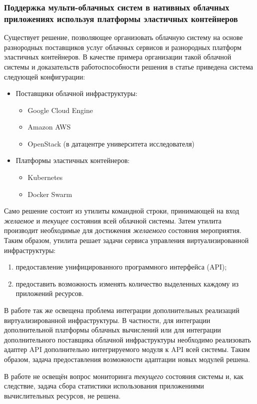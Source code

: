 \subsubsection*{Поддержка мульти-облачных систем в нативных облачных приложениях используя платформы эластичных контейнеров}
Существует решение\cite{smuggling}, позволяющее организовать облачную систему на основе разнородных поставщиков услуг облачных сервисов и разнородных платформ эластичных контейнеров.
В качестве примера организации такой облачной системы и доказательств работоспособности решения в статье приведена система следующей конфигурации:
\begin{itemize}
    \item Поставщики облачной инфраструктуры:
    \begin{itemize}
        \item Google Cloud Engine
        \item Amazon AWS
        \item OpenStack (в датацентре университета исследователя)
    \end{itemize}
    \item Платформы эластичных контейнеров:
    \begin{itemize}
        \item Kubernetes
        \item Docker Swarm
    \end{itemize}
\end{itemize}

Само решение состоит из утилиты командной строки, принимающей на вход \textit{желаемое} и \textit{текущее} состояния всей облачной системы. 
Затем утилита производит необходимые для достижения \textit{желаемого} состояния мероприятия.
Таким образом, утилита решает задачи сервиса управления виртуализированной инфраструктуры:
\begin{enumerate}
    \item предоставление унифицированного программного интерфейса (API);
    \item предоставить возможность изменять количество выделенных каждому из приложений ресурсов.
\end{enumerate}

В работе так же освещена проблема интеграции дополнительных реализаций виртуализированной инфраструктуры.
В частности, для интеграции дополнительной платформы облачных вычислений или для интеграции дополнительного поставщика облачной инфраструктуры необходимо реализовать адаптер API дополнительно интегрируемого модуля к API всей системы.
Таким образом, задача предоставления возможности адаптации новых модулей решена.

В работе не освещён вопрос мониторинга \textit{текущего} состояния системы и, как следствие, задача сбора статистики использования приложениями вычислительных ресурсов, не решена.